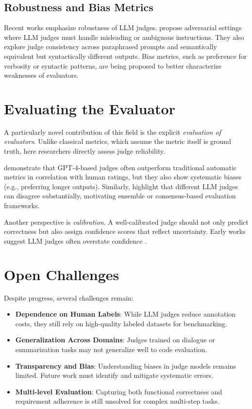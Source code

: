 \subsection{Robustness and Bias Metrics}
Recent works emphasize robustness of LLM judges.\citet{wang2023aligning} propose adversarial settings where LLM judges must handle misleading or ambiguous instructions. They also explore judge consistency across paraphrased prompts and semantically equivalent but syntactically different outputs. Bias metrics, such as preference for verbosity or syntactic patterns, are being proposed to better characterize weaknesses of evaluators.

\section{Evaluating the Evaluator}
A particularly novel contribution of this field is the explicit \textit{evaluation of evaluators}. Unlike classical metrics, which assume the metric itself is ground truth, here researchers directly assess judge reliability.

\citet{fu2023gptscore} demonstrate that GPT-4-based judges often outperform traditional automatic metrics in correlation with human ratings, but they also show systematic biases (e.g., preferring longer outputs). Similarly, \citet{wang2023aligning} highlight that different LLM judges can disagree substantially, motivating ensemble or consensus-based evaluation frameworks.

Another perspective is \textit{calibration}. A well-calibrated judge should not only predict correctness but also assign confidence scores that reflect uncertainty. Early works suggest LLM judges often overstate confidence \citep{zheng2023judgelm}.

\section{Open Challenges}
Despite progress, several challenges remain:

\begin{itemize}
    \item \textbf{Dependence on Human Labels}: While LLM judges reduce annotation costs, they still rely on high-quality labeled datasets for benchmarking.
    \item \textbf{Generalization Across Domains}: Judges trained on dialogue or summarization tasks may not generalize well to code evaluation.
    \item \textbf{Transparency and Bias}: Understanding biases in judge models remains limited. Future work must identify and mitigate systematic errors.
    \item \textbf{Multi-level Evaluation}: Capturing both functional correctness and requirement adherence is still unsolved for complex multi-step tasks.
\end{itemize}

